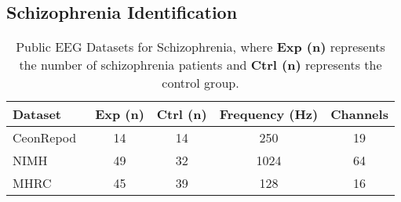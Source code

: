 


\subsection{Schizophrenia Identification}


\begin{table}[t]
\renewcommand{\arraystretch}{1.2}
\caption{Public EEG Datasets for Schizophrenia, where \textbf{Exp (n)} represents the number of schizophrenia patients and \textbf{Ctrl (n)} represents the control group.}
\label{tab:sz}
\footnotesize
\centering
\begin{tabular}{lcccc}
\hline
\textbf{Dataset}      & \textbf{Exp (n)} & \textbf{Ctrl (n)} & \textbf{Frequency (Hz)} & \textbf{Channels} \\
\hline
CeonRepod~\cite{olejarczyk2017graph}   & 14              & 14               & 250              & 19                \\
NIMH~\cite{ford2014did}                & 49              & 32               & 1024             & 64                \\
MHRC~\cite{borisov2005analysis}        & 45              & 39               & 128              & 16                \\
\hline
\end{tabular}
\end{table}


